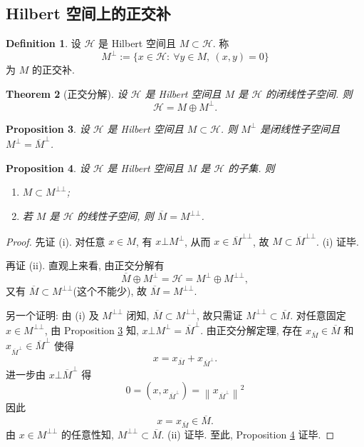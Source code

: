 \documentclass[a4paper,11pt]{article}
\newtheorem{theorem}{Theorem}[section]
\newtheorem{proposition}[theorem]{Proposition}
\theoremstyle{definition}
\newtheorem{definition}[theorem]{Definition}
\begin{document}
\begin{CJK*}{UTF8}{gbsn}
\section{Hilbert 空间上的正交补}

\begin{definition}
    设 $ \mathcal{H} $ 是 Hilbert 空间且 $ M \subset \mathcal{H} $. 称
    $$
        M^\bot := \{ x \in \mathcal{H} :\ \forall y \in M,\ (x, y) = 0 \}
    $$
    为 $ M $ 的正交补.
\end{definition}

\begin{theorem}[正交分解]
    设 $ \mathcal{H} $ 是 Hilbert 空间且 $ M $ 是 $ \mathcal{H} $ 的闭线性子空间. 则
    $$
        \mathcal{H} = M \oplus M^\bot.
    $$
\end{theorem}

\begin{proposition} \label{1}
    设 $ \mathcal{H} $ 是 Hilbert 空间且 $ M \subset \mathcal{H} $. 
    则 $ M^\bot $ 是闭线性子空间且 $ M^\bot = \overline{M}^\bot $.
\end{proposition}

\begin{proposition} \label{2}
    设 $ \mathcal{H} $ 是 Hilbert 空间且 $ M $ 是 $ \mathcal{H} $ 的子集. 则
    \begin{enumerate}[{\rm(i)}]
        \item $ M \subset M^{\bot \bot} $;
        \item 若 $ M $ 是 $ \mathcal{H} $ 的线性子空间, 则 $ \overline{M} = M^{\bot \bot} $.
    \end{enumerate}
\end{proposition}

\begin{proof}
    先证 (i). 对任意 $ x \in M $, 有 
    $ x \bot M^\bot $, 从而 $ x \in \overline{M}^{\bot \bot} $,
    故 $ M \subset \overline{M}^{\bot \bot} $. (i) 证毕.
    
    再证 (ii). 直观上来看, 由正交分解有
    $$
        \overline{M} \oplus M^\bot = \mathcal{H} = M^\bot \oplus M^{\bot \bot},
    $$
    又有 $ \overline{M} \subset M^{\bot \bot} $(这个不能少), 故 $ \overline{M} = M^{\bot \bot} $.
    
    另一个证明: 由 (i) 及 $ M^{\bot \bot} $ 闭知, $ \overline{M} \subset M^{\bot \bot} $,
    故只需证 $ M^{\bot \bot} \subset \overline{M} $. 
    对任意固定 $ x \in M^{\bot \bot} $,
    由 Proposition \ref{1} 知, $ x \bot M^\bot = \overline{M}^\bot $. 由正交分解定理,
    存在 $ x_{\overline{M}} \in \overline{M} $ 和 $ x_{\overline{M}^\bot} \in \overline{M}^\bot $ 
    使得 
    $$ 
        x = x_{\overline{M}} + x_{\overline{M}^\bot}. 
    $$
    进一步由 $ x \bot \overline{M}^\bot $ 得
    $$
        0 = \left( x, x_{\overline{M}^\bot} \right)  = \left\|  x_{\overline{M}^\bot} \right\|^2
    $$
    因此
    $$
        x = x_{\overline{M}} \in \overline{M}.
    $$
    由 $ x \in M^{\bot \bot} $ 的任意性知, $ M^{\bot \bot} \subset \overline{M} $. (ii) 证毕.
    至此, Proposition \ref{2} 证毕.
\end{proof}


\end{CJK*}
\end{document}
